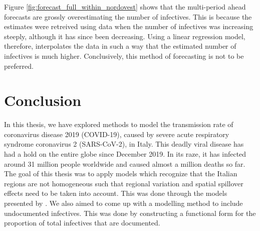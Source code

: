 \documentclass[12pt]{article}
\begin{document}

    Figure \ref{fig:forecast_full_within_nordovest} shows that the multi-period ahead forecasts are grossly overestimating the number of infectives. This is because the estimates were retreived using data when the number of infectives was increasing steeply, although it has since been decreasing. Using a linear regression model, therefore, interpolates the data in such a way that the estimated number of infectives is much higher. Conclusively, this method of forecasting is not to be preferred.

	\section{Conclusion} \label{sec:conclusion}
	
	In this thesis, we have explored methods to model the transmission rate of coronavirus disease 2019 (COVID-19), caused by severe acute respiratory syndrome coronavirus 2 (SARS-CoV-2), in Italy. This deadly viral disease has had a hold on the entire globe since December 2019. In its raze, it has infected around 31 million people worldwide and caused almost a million deaths so far. The goal of this thesis was to apply models which recognize that the Italian regions are not homogeneous such that regional variation and spatial spillover effects need to be taken into account. This was done through the models presented by \textcite{adda2016economic}. We also aimed to come up with a modelling method to include undocumented infectives. This was done by constructing a functional form for the proportion of total infectives that are documented. \\
	
\end{document}
